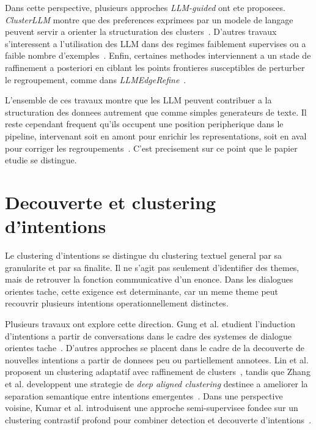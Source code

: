 Dans cette perspective, plusieurs approches \emph{LLM-guided} ont ete
proposees. \emph{ClusterLLM} montre que des preferences exprimees par un modele
de langage peuvent servir a orienter la structuration des
clusters~\cite{zhang2023clusterllm}. D'autres travaux s'interessent a
l'utilisation des LLM dans des regimes faiblement supervises ou a faible nombre
d'exemples~\cite{viswanathan2024fewshot}. Enfin, certaines methodes
interviennent a un stade de raffinement a posteriori en ciblant les points
frontieres susceptibles de perturber le regroupement, comme dans
\emph{LLMEdgeRefine}~\cite{feng2024llmedgerefine}.

L'ensemble de ces travaux montre que les LLM peuvent contribuer a la
structuration des donnees autrement que comme simples generateurs de texte. Il
reste cependant frequent qu'ils occupent une position peripherique dans le
pipeline, intervenant soit en amont pour enrichir les representations, soit en
aval pour corriger les regroupements~\cite{hong2025dialinllm}. C'est
precisement sur ce point que le papier etudie se distingue.

\section{Decouverte et clustering d'intentions}

Le clustering d'intentions se distingue du clustering textuel general par sa
granularite et par sa finalite. Il ne s'agit pas seulement d'identifier des
themes, mais de retrouver la fonction communicative d'un enonce. Dans les
dialogues orientes tache, cette exigence est determinante, car un meme theme
peut recouvrir plusieurs intentions operationnellement distinctes.

Plusieurs travaux ont explore cette direction. Gung et al. etudient
l'induction d'intentions a partir de conversations dans le cadre des systemes
de dialogue orientes tache~\cite{gung2023intent}. D'autres approches se
placent dans le cadre de la decouverte de nouvelles intentions a partir de
donnees peu ou partiellement annotees. Lin et al. proposent un clustering
adaptatif avec raffinement de clusters~\cite{lin2020discovering}, tandis que
Zhang et al. developpent une strategie de \emph{deep aligned clustering}
destinee a ameliorer la separation semantique entre intentions
emergentes~\cite{zhang2021discovering}. Dans une perspective voisine, Kumar et
al. introduisent une approche semi-supervisee fondee sur un clustering
contrastif profond pour combiner detection et decouverte
d'intentions~\cite{kumar2022intent}.

